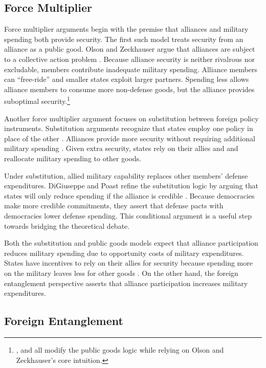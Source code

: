 \documentclass[12pt]{article}
\begin{document}
\subsection{Force Multiplier} 


Force multiplier arguments begin with the premise that alliances and military spending both provide security.
The first such model treats security from an alliance as a public good. 
Olson and Zeckhauser argue that alliances are subject to a collective action problem \citep{OlsonZeckhauser1966}.
Because alliance security is neither rivalrous nor excludable, members contribute inadequate military spending. 
Alliance members can ``free-ride'' and smaller states exploit larger partners. 
Spending less allows alliance members to consume more non-defense goods, but the alliance provides suboptimal security.\footnote{\citet{SandlerForbes1980}, \citet{Oneal1990} and \citet{SandlerHartley2001} all modify the public goods logic while relying on Olson and Zeckhauser's core intuition.} 


Another force multiplier argument focuses on substitution between foreign policy instruments.
Substitution arguments recognize that states employ one policy in place of the other \citep{MostStarr1989}.
Alliances provide more security without requiring additional military spending \citep{Morrow1993, Conybeare1994}. 
Given extra security, states rely on their allies and and reallocate military spending to other goods. 


Under substitution, allied military capability replaces other members' defense expenditures. 
DiGiuseppe and Poast refine the substitution logic by arguing that states will only reduce spending if the alliance is credible \citep{DigiuseppePoast2016}.
Because democracies make more credible commitments, they assert that defense pacts with democracies lower defense spending.
This conditional argument is a useful step towards bridging the theoretical debate. 


Both the substitution and public goods models expect that alliance participation reduces military spending due to opportunity costs of military expenditures. 
States have incentives to rely on their allies for security because spending more on the military leaves less for other goods \citep{Fordham1998, Fearon2018}.
On the other hand, the foreign entanglement perspective asserts that alliance participation increases military expenditures. 


\subsection{Foreign Entanglement}
\end{document}
